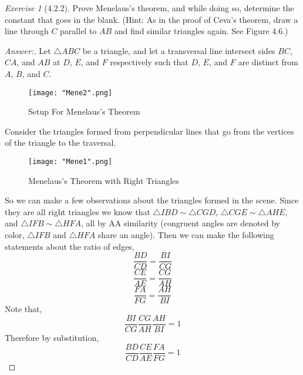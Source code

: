\documentclass[12pt]{amsart}
\theoremstyle{remark}
\newtheorem*{exercise}{Exercise}%
\theoremstyle{mycomment}
\def\msquare{\mathord{\scalerel*{\Box}{gX}}}
\begin{document}
\begin{exercise}[\msquare 4.2.2] Prove Menelaus’s theorem, and while doing so, determine the constant that goes in the blank. (Hint: As in the proof of Ceva’s theorem, draw a line through $C$ parallel to $AB$ and find similar triangles again. See Figure 4.6.)\\


\begin{proof}[Answer:] 
Let $\triangle ABC$ be a triangle, and let a transversal line intersect sides $BC$, $CA$, and $AB$ at $D$, $E$, and $F$ respectively such that $D$, $E$, and $F$ are distinct from $A$, $B$, and $C$. 

\begin{figure}[H]
\caption{Setup For Menelaus’s Theorem}
\centering
\texttt{[image: "Mene2".png]}
\end{figure}

Consider the triangles formed from perpendicular lines that go from the vertices of the triangle to the traversal.

\begin{figure}[H]
\caption{Menelaus’s Theorem with Right Triangles}
\centering
\texttt{[image: "Mene1".png]}
\end{figure}


 So we can make a few observations about the triangles formed in the scene. Since they are all right triangles we know that $\triangle IBD \sim \triangle CGD$, $\triangle CGE \sim \triangle AHE$, and $\triangle IFB \sim \triangle HFA$, all by AA similarity (congruent angles are denoted by color, $\triangle IFB$ and $\triangle HFA$ share an angle). Then we can make the following statements about the ratio of edges,
\begin{equation*}
\frac{BD}{CD} = \frac{BI}{CG}
\end{equation*}
\begin{equation*}
\frac{CE}{AE} = \frac{CG}{AH}
\end{equation*}
\begin{equation*}
\frac{FA}{FG} = \frac{AH}{BI}
\end{equation*}
Note that,
\begin{equation*}
\frac{BI}{CG}\frac{CG}{AH}\frac{AH}{BI} = 1
\end{equation*}
Therefore by substitution,
\begin{equation*}
\frac{BD}{CD}\frac{CE}{AE} \frac{FA}{FG}  = 1
\end{equation*}




















\end{proof}
\end{exercise}


 
\end{document}
